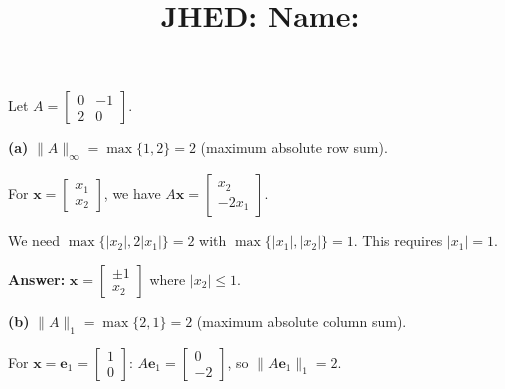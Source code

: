 \documentclass[reqno, answers]{exam}
\title{\normalsize{
  JHED: \underline{\hspace{4cm}} \hspace{1em} Name: \underline{\hspace{9cm}}}
   }
\author{}
\date{}
\begin{document}
\maketitle
\vspace{-2cm} %

\begin{questions}

\question 
Let $A = \begin{bmatrix} 0 & -1 \\ 2 & 0 \end{bmatrix}$.

\begin{solution}
\textbf{(a)} $\|A\|_\infty = \max\{1, 2\} = 2$ (maximum absolute row sum).

For $\mathbf{x} = \begin{bmatrix} x_1 \\ x_2 \end{bmatrix}$, we have $A\mathbf{x} = \begin{bmatrix} x_2 \\ -2x_1 \end{bmatrix}$.

We need $\max\{|x_2|, 2|x_1|\} = 2$ with $\max\{|x_1|, |x_2|\} = 1$. This requires $|x_1| = 1$.

\textbf{Answer:} $\mathbf{x} = \begin{bmatrix} \pm 1 \\ x_2 \end{bmatrix}$ where $|x_2| \leq 1$.

\textbf{(b)} $\|A\|_1 = \max\{2, 1\} = 2$ (maximum absolute column sum).

For $\mathbf{x} = \mathbf{e}_1 = \begin{bmatrix} 1 \\ 0 \end{bmatrix}$: $A\mathbf{e}_1 = \begin{bmatrix} 0 \\ -2 \end{bmatrix}$, so $\|A\mathbf{e}_1\|_1 = 2$.


\end{solution}
\end{questions}
\end{document}
